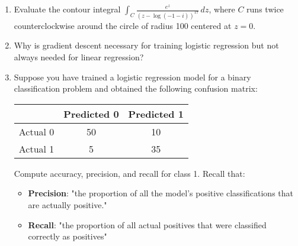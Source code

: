 \documentclass[12pt]{article}
\begin{document}
\begin{enumerate}[label=\textbf{Problem \arabic*.}, leftmargin=*]
\newpage

\item Evaluate the contour integral $\int_C \frac{e^z}{(z-\log(-1-i))^{17}} \, dz$, where $C$ runs twice counterclockwise around the circle of radius 100 centered at $z=0$.
\vspace{3cm}


\item Why is gradient descent necessary for training logistic regression but not always needed for linear regression?
\vspace{3cm}

\item Suppose you have trained a logistic regression model for a binary classification problem and obtained the following confusion matrix:
\begin{center}
\begin{tabular}{c|c|c}
     & Predicted 0 & Predicted 1 \\
    \hline
    Actual 0 & 50 & 10 \\
    Actual 1 & 5 & 35 \\
\end{tabular}
\end{center}
Compute accuracy, precision, and recall for class 1. Recall that: 
\begin{itemize}
\item \textbf{Precision}: "the proportion of all the model's positive classifications that are actually positive." 
\item \textbf{Recall}: "the proportion of all actual positives that were classified correctly as positives"
\end{itemize}
\vspace{3cm}

\end{enumerate}
\end{document}

